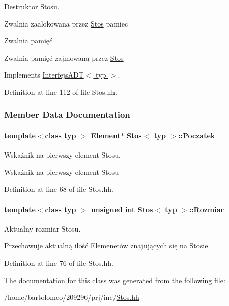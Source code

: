Destruktor Stosu. 

Zwalnia zaalokowana przez \hyperlink{class_stos}{Stos} pamiec

Zwalnia pamięć

Zwalnia pamięć zajmowaną przez \hyperlink{class_stos}{Stos} 

Implements \hyperlink{class_interfejs_a_d_t_a75427479b00e3d4a0c5f9615216262ea}{Interfejs\-A\-D\-T$<$ typ $>$}.



Definition at line 112 of file Stos.\-hh.



\subsubsection{Member Data Documentation}
\hypertarget{class_stos_a99a2b9b4cff5d01c77cfa7937bdc3675}{
\paragraph[{Poczatek}]{\setlength{\rightskip}{0pt plus 5cm}template$<$class typ $>$ {\bf Element}$\ast$ {\bf Stos}$<$ typ $>$\-::Poczatek\hspace{0.3cm}{\ttfamily [private]}}}\label{class_stos_a99a2b9b4cff5d01c77cfa7937bdc3675}


Wskaźnik na pierwszy element Stosu. 

Wskaźnik na pierwszy element Stosu 

Definition at line 68 of file Stos.\-hh.

\hypertarget{class_stos_af27f11e8c75d948bfa667353019ae653}{
\paragraph[{Rozmiar}]{\setlength{\rightskip}{0pt plus 5cm}template$<$class typ $>$ unsigned int {\bf Stos}$<$ typ $>$\-::Rozmiar\hspace{0.3cm}{\ttfamily [private]}}}\label{class_stos_af27f11e8c75d948bfa667353019ae653}


Aktualny rozmiar Stosu. 

Przechowuje aktualną ilość Elemenetów znajujących się na Stosie 

Definition at line 76 of file Stos.\-hh.



The documentation for this class was generated from the following file\-:\begin{DoxyCompactItemize}
\item 
/home/bartolomeo/209296/prj/inc/\hyperlink{_stos_8hh}{Stos.\-hh}\end{DoxyCompactItemize}
